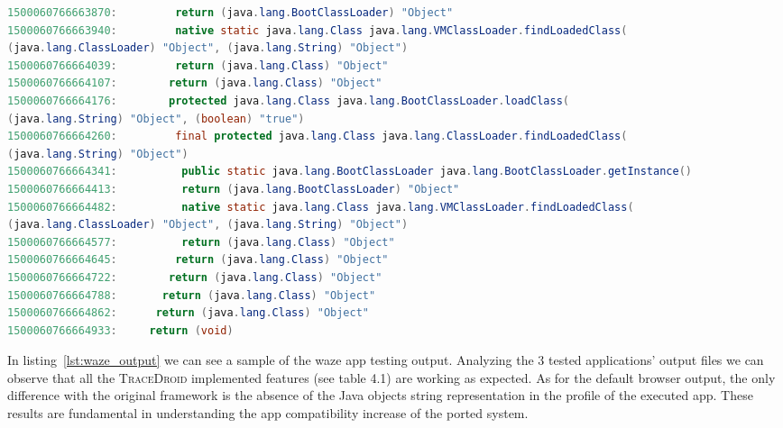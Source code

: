 \begin{listing}[!h]
\begin{adjustwidth}{-9em}{-9em}
\begin{lstlisting}[language=Java]
1500060766663870:         return (java.lang.BootClassLoader) "Object"
1500060766663940:         native static java.lang.Class java.lang.VMClassLoader.findLoadedClass(
(java.lang.ClassLoader) "Object", (java.lang.String) "Object")
1500060766664039:         return (java.lang.Class) "Object"
1500060766664107:        return (java.lang.Class) "Object"
1500060766664176:        protected java.lang.Class java.lang.BootClassLoader.loadClass(
(java.lang.String) "Object", (boolean) "true")
1500060766664260:         final protected java.lang.Class java.lang.ClassLoader.findLoadedClass(
(java.lang.String) "Object")
1500060766664341:          public static java.lang.BootClassLoader java.lang.BootClassLoader.getInstance()
1500060766664413:          return (java.lang.BootClassLoader) "Object"
1500060766664482:          native static java.lang.Class java.lang.VMClassLoader.findLoadedClass(
(java.lang.ClassLoader) "Object", (java.lang.String) "Object")
1500060766664577:          return (java.lang.Class) "Object"
1500060766664645:         return (java.lang.Class) "Object"
1500060766664722:        return (java.lang.Class) "Object"
1500060766664788:       return (java.lang.Class) "Object"
1500060766664862:      return (java.lang.Class) "Object"
1500060766664933:     return (void)
    \end{lstlisting}
  \end{adjustwidth}
\end{listing}

In listing~\ref{lst:waze_output} we can see a sample of the waze app testing
output. Analyzing the 3 tested applications' output files we can
observe that all the \textsc{TraceDroid} implemented features (see table 4.1)
are working as expected. As for the default browser output, the only
difference with the original framework is the absence of the Java
objects string representation in the profile of the executed
app. These results are fundamental in understanding the app
compatibility increase of the ported system.

